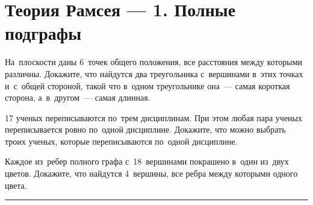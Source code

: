 
\section*{Теория Рамсея --- 1. Полные подграфы}


\begin{problems}

На~плоскости даны 6~точек общего положения, все расстояния между которыми
различны.
Докажите, что найдутся два треугольника с~вершинами в~этих точках и~с~общей
стороной, такой что в~одном треугольнике она~--- самая короткая сторона,
а~в~другом~--- самая длинная.

17 ученых переписываются по~трем дисциплинам.
При этом любая пара ученых переписывается ровно по~одной дисциплине.
Докажите, что можно выбрать троих ученых, которые переписываются по~одной
дисциплине.


Каждое из~ребер полного графа с~18~вершинами покрашено в~один из~двух цветов.
Докажите, что найдутся 4~вершины, все ребра между которыми одного цвета.

\end{problems}

\medskip
\hrule

